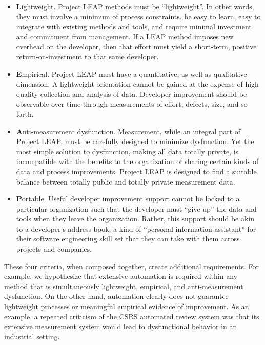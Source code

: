 \begin{itemize}
  
\item {\bf L}ightweight.  Project LEAP methods must be ``lightweight''.
  In other words, they must involve a minimum of process constraints, be
  easy to learn, easy to integrate with existing methods and tools, and
  require minimal investment and commitment from management. If a LEAP
  method imposes new overhead on the developer, then that effort must yield
  a short-term, positive return-on-investment to that same developer.
  
\item {\bf E}mpirical. Project LEAP must have a quantitative, as well as
  qualitative dimension.  A lightweight orientation cannot be gained at the
  expense of high quality collection and analysis of data. Developer
  improvement should be observable over time through measurements of
  effort, defects, size, and so forth.
  
\item {\bf A}nti-measurement dysfunction.   Measurement, while an
  integral part of Project LEAP, must be carefully designed to minimize
  dysfunction.  Yet the most simple solution to dysfunction, making all
  data totally private, is incompatible with the benefits to the
  organization of sharing certain kinds of data and process
improvements. Project LEAP is designed to find a
  suitable balance between totally public and totally private measurement data.
  
\item {\bf P}ortable. 
  Useful developer improvement support cannot be locked to a particular
  organization such that the developer must ``give up'' the data and tools
  when they leave the organization. Rather, this support should be akin to a
  developer's address book; a kind of ``personal information assistant''
  for their software engineering skill set that they can take with them
  across projects and companies.

\end{itemize}

These four criteria, when composed together, create additional
requirements. For example, we hypothesize that extensive automation is
required within any method that is simultaneously lightweight, empirical,
and anti-measurement dysfunction.  On the other hand, automation clearly
does not guarantee lightweight processes or meaningful empirical evidence
of improvement. As an example, a repeated criticism of the CSRS automated
review system was that its extensive measurement system would lead to
dysfunctional behavior in an industrial setting.

